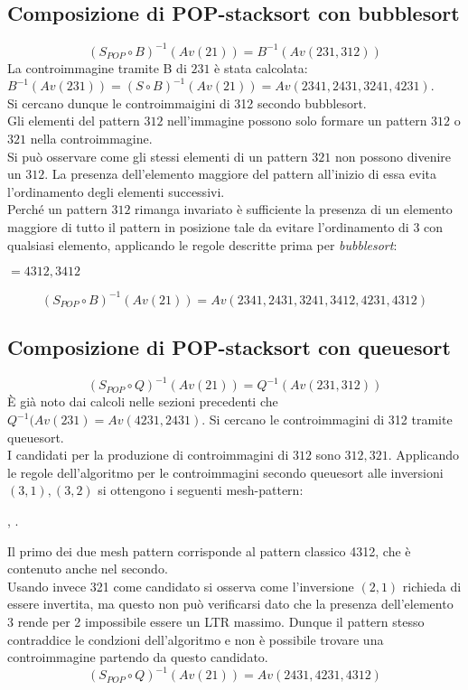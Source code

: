 \subsection{Composizione di {POP-stacksort} con {bubblesort}}
$$(S_{POP}\circ{B})^{-1}(Av(21))=B^{-1}(Av(231,312))$$
La controimmagine tramite B di $231$ \`e stata calcolata: $B^{-1}(Av(231)) = (S\circ{B})^{-1}(Av(21)) = Av(2341, 2431, 3241, 4231)$.\\
Si cercano dunque le controimmaigini di 312 secondo bubblesort. \\
Gli elementi del pattern $312$ nell'immagine possono solo formare un pattern $312$ o $321$ nella controimmagine.\\
Si pu\`o osservare come gli stessi elementi di un pattern $321$ non possono divenire un $312$. La presenza dell'elemento maggiore del pattern all'inizio di essa evita l'ordinamento degli elementi successivi.\\
Perch\'e un pattern $312$ rimanga invariato \`e sufficiente la presenza di un elemento maggiore di tutto il pattern in posizione tale da evitare l'ordinamento di $3$ con qualsiasi elemento, applicando le regole descritte prima per \textit{bubblesort}: 
\begin{center}
$=4312,3412$
\end{center}
$$(S_{POP}\circ{B})^{-1}(Av(21))=Av(2341, 2431, 3241, 3412, 4231, 4312)$$
\subsection{Composizione di {POP-stacksort} con {queuesort}}
$$(S_{POP}\circ{Q})^{-1}(Av(21))=Q^{-1}(Av(231,312))$$
\`E gi\`a noto dai calcoli nelle sezioni precedenti che $Q^{-1}(Av(231)=Av(4231,2431)$. Si cercano le controimmagini di 312 tramite queuesort.\\
I candidati per la produzione di controimmagini di $312$ sono $312, 321$. Applicando le regole dell'algoritmo per le controimmagini secondo queuesort alle inversioni $(3,1),(3,2)$ si ottengono i seguenti mesh-pattern:
\begin{center}
,
.
\end{center}
Il primo dei due mesh pattern corrisponde al pattern classico 4312, che \`e contenuto anche nel secondo.\\
Usando invece 321 come candidato si osserva come l'inversione $(2,1)$ richieda di essere invertita, ma questo non pu\`o verificarsi dato che la presenza dell'elemento 3 rende per 2 impossibile essere un LTR massimo. Dunque il pattern stesso contraddice le condzioni dell'algoritmo e non \`e possibile trovare una controimmagine partendo da questo candidato.\\
$$(S_{POP}\circ {Q})^{-1}(Av(21))=Av(2431,4231,4312)$$
